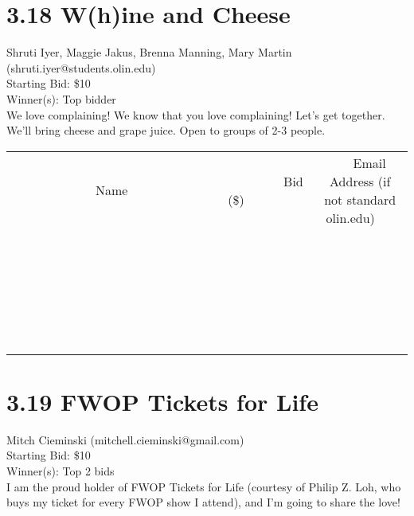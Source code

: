 \documentclass[11pt]{article}
\begin{document}
\section*{3.18 W(h)ine and Cheese}
Shruti Iyer, Maggie Jakus, Brenna Manning, Mary Martin (shruti.iyer@students.olin.edu) \\
Starting Bid: \$10 \\
Winner(s): 
Top bidder \\
We love complaining! We know that you love complaining! Let's get together. We'll bring cheese and grape juice. Open to groups of 2-3 people. \\[6ex]
\begin{tabular}{c c c}
~~~~~~~~~~~~~Name~~~~~~~~~~~~~ & ~~~~~~~~~Bid (\$)~~~~~~~~~ & ~~~Email Address (if not standard olin.edu)~~~ \\
 & & \\
\hline
 & & \\
\hline
 & & \\
\hline
 & & \\
\hline
 & & \\
\hline
 & & \\
\hline
 & & \\
\hline
 & & \\
\hline
 & & \\
\hline
 & & \\
\hline
 & & \\
\hline
 & & \\
\hline
 & & \\
\hline
 & & \\
\hline
 & & \\
\hline
 & & \\
\hline
 & & \\
\hline
 & & \\
\hline
 & & \\
\hline
 & & \\
\hline
 & & \\
\hline
 & & \\
\hline
 & & \\
\hline
 & & \\
\hline
 & & \\
\hline
 & & \\
\hline
\end{tabular}
\clearpage
\section*{3.19 FWOP Tickets for Life}
Mitch Cieminski (mitchell.cieminski@gmail.com) \\
Starting Bid: \$10 \\
Winner(s): 
Top 2 bids \\
I am the proud holder of FWOP Tickets for Life (courtesy of Philip Z. Loh, who buys my ticket for every FWOP show I attend), and I'm going to share the love!
\end{document}
